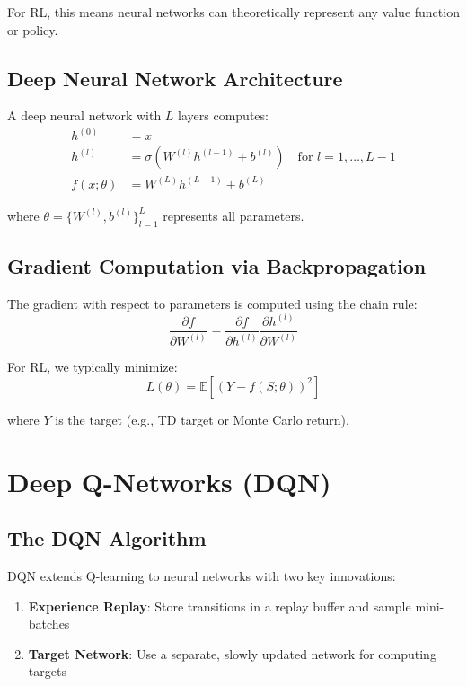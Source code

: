 For RL, this means neural networks can theoretically represent any value function or policy.

\subsection{Deep Neural Network Architecture}

A deep neural network with $L$ layers computes:
\begin{align}
h^{(0)} &= x \\
h^{(l)} &= \sigma(W^{(l)} h^{(l-1)} + b^{(l)}) \quad \text{for } l = 1, \ldots, L-1 \\
f(x; \theta) &= W^{(L)} h^{(L-1)} + b^{(L)}
\end{align}

where $\theta = \{W^{(l)}, b^{(l)}\}_{l=1}^L$ represents all parameters.

\subsection{Gradient Computation via Backpropagation}

The gradient with respect to parameters is computed using the chain rule:
\begin{equation}
\frac{\partial f}{\partial W^{(l)}} = \frac{\partial f}{\partial h^{(l)}} \frac{\partial h^{(l)}}{\partial W^{(l)}}
\end{equation}

For RL, we typically minimize:
\begin{equation}
L(\theta) = \mathbb{E} \left[ \left( Y - f(S; \theta) \right)^2 \right]
\end{equation}

where $Y$ is the target (e.g., TD target or Monte Carlo return).

\section{Deep Q-Networks (DQN)}

\subsection{The DQN Algorithm}

DQN extends Q-learning to neural networks with two key innovations:

\begin{enumerate}
\item \textbf{Experience Replay}: Store transitions in a replay buffer and sample mini-batches
\item \textbf{Target Network}: Use a separate, slowly updated network for computing targets
\end{enumerate}

